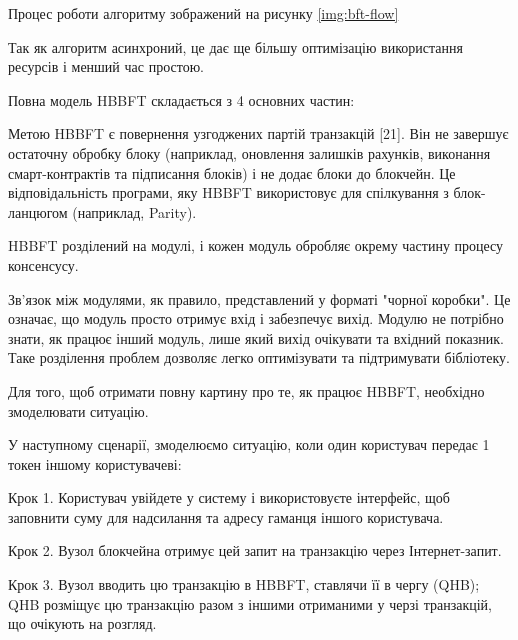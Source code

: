 \documentclass{lib/styles/default-style}
\begin{document}
    Процес роботи алгоритму зображений на рисунку \ref{img:bft-flow}


    Так як алгоритм асинхроний, це дає ще більшу оптимізацію використання ресурсів і менший час простою.

    Повна модель HBBFT складається з 4 основних частин:

    

    Метою HBBFT є повернення узгоджених партій транзакцій [21].
    Він не завершує остаточну обробку блоку (наприклад, оновлення залишків рахунків, виконання смарт-контрактів та підписання блоків)
    і не додає блоки до блокчейн. Це відповідальність програми, яку HBBFT використовує для спілкування з блок-ланцюгом (наприклад, Parity).

    HBBFT розділений на модулі, і кожен модуль обробляє окрему частину процесу консенсусу.

    Зв'язок між модулями, як правило, представлений у форматі "чорної коробки".
    Це означає, що модуль просто отримує вхід і забезпечує вихід.
    Модулю не потрібно знати, як працює інший модуль, лише який вихід очікувати та вхідний показник.
    Таке розділення проблем дозволяє легко оптимізувати та підтримувати бібліотеку.

    Для того, щоб отримати повну картину про те, як працює HBBFT, необхідно змоделювати ситуацію.

    У наступному сценарії, змоделюємо ситуацію, коли один користувач передає 1 токен іншому користувачеві:
    
    Крок 1. Користувач увійдете у систему і використовуєте інтерфейс,
    щоб заповнити суму для надсилання та адресу гаманця іншого користувача.

    Крок 2. Вузол блокчейна отримує цей запит на транзакцію через Інтернет-запит.
    
    Крок 3. Вузол вводить цю транзакцію в HBBFT, ставлячи її в чергу (QHB);
    QHB розміщує цю транзакцію разом з іншими отриманими у черзі транзакцій,
        що очікують на розгляд.
    
\end{document}

